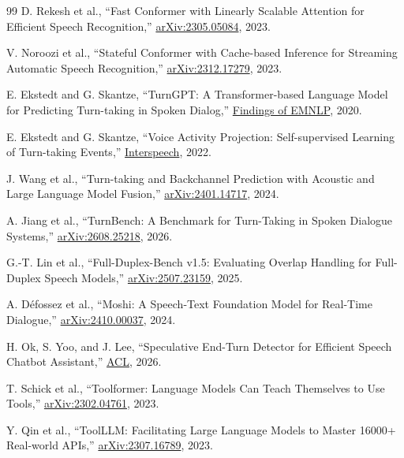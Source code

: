 \documentclass[10pt,twocolumn]{article}
\begin{document}
\balance
\begingroup
\small
{}
\begin{thebibliography}{99}
D. Rekesh et al., ``Fast Conformer with Linearly Scalable Attention for Efficient Speech
Recognition,'' \href{https://arxiv.org/abs/2305.05084}{arXiv:2305.05084}, 2023.

V. Noroozi et al., ``Stateful Conformer with Cache-based Inference for Streaming Automatic Speech
Recognition,'' \href{https://arxiv.org/abs/2312.17279}{arXiv:2312.17279}, 2023.

E. Ekstedt and G. Skantze, ``TurnGPT: A Transformer-based Language Model for Predicting Turn-taking
in Spoken Dialog,'' \href{https://doi.org/10.18653/v1/2020.findings-emnlp.268}{Findings of EMNLP},
2020.

E. Ekstedt and G. Skantze, ``Voice Activity Projection: Self-supervised Learning of Turn-taking
Events,'' \href{https://doi.org/10.21437/Interspeech.2022-10955}{Interspeech}, 2022.

J. Wang et al., ``Turn-taking and Backchannel Prediction with Acoustic and Large Language Model
Fusion,'' \href{https://arxiv.org/abs/2401.14717}{arXiv:2401.14717}, 2024.

A. Jiang et al., ``TurnBench: A Benchmark for Turn-Taking in Spoken Dialogue Systems,''
\href{https://arxiv.org/abs/2608.25218}{arXiv:2608.25218}, 2026.

G.-T. Lin et al., ``Full-Duplex-Bench v1.5: Evaluating Overlap Handling for Full-Duplex Speech
Models,'' \href{https://arxiv.org/abs/2507.23159}{arXiv:2507.23159}, 2025.

A. D\'efossez et al., ``Moshi: A Speech-Text Foundation Model for Real-Time Dialogue,''
\href{https://arxiv.org/abs/2410.00037}{arXiv:2410.00037}, 2024.

H. Ok, S. Yoo, and J. Lee, ``Speculative End-Turn Detector for Efficient Speech Chatbot Assistant,''
\href{https://doi.org/10.18653/v1/2026.acl-long.2094}{ACL}, 2026.

T. Schick et al., ``Toolformer: Language Models Can Teach Themselves to Use Tools,''
\href{https://arxiv.org/abs/2302.04761}{arXiv:2302.04761}, 2023.

Y. Qin et al., ``ToolLLM: Facilitating Large Language Models to Master 16000+ Real-world APIs,''
\href{https://arxiv.org/abs/2307.16789}{arXiv:2307.16789}, 2023.


\end{thebibliography}
\end{document}
